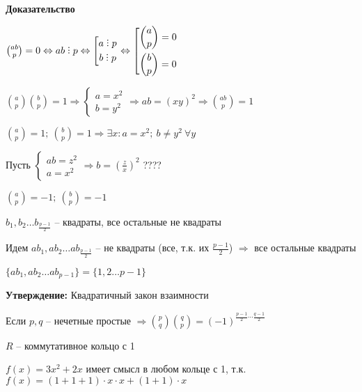 \documentclass[14pt, letter paper]{article}
\def\divby{%
  \mathrel{\text{\vbox{\baselineskip.65ex\lineskiplimit0pt\hbox{.}\hbox{.}\hbox{.}}}}%
}
\begin{document}
\begin{enumerate}
    \begin{center}
        \textbf{Доказательство}
    \end{center}

    ${ab \choose p} = 0 \Leftrightarrow ab \divby p \Leftrightarrow \left[ \begin{gathered}
        a \divby p \\
        b \divby p
    \end{gathered} \right. \Leftrightarrow \left[ \begin{gathered}
        {a \choose p} = 0 \\
        {b \choose p} = 0
    \end{gathered} \right.$

    ${a \choose p}{b \choose p} = 1 \Rightarrow \begin{cases}
        a = x^2 \\
        b = y^2
    \end{cases} \Rightarrow ab = (xy)^2 \Rightarrow {ab \choose p} = 1$

    ${a \choose p} = 1;\ {b \choose p} = 1 \Rightarrow \exists x : a = x^2;\ b \neq y^2\ \forall y$

    Пусть $\begin{cases}
        ab = z^2 \\
        a = x^2
    \end{cases} \Rightarrow b = (\frac{z}{x})^2$ ????

    ${a \choose p} = -1;\ {b \choose p} = -1$

    $b_1, b_2 \ldots b_\frac{p-1}{2}$ -- квадраты, все остальные не квадраты

    Идем $ab_1, ab_2 \ldots ab_\frac{p-1}{2}$ -- не квадраты (все, т.к. их $\frac{p-1}{2}$) $\Rightarrow$ все остальные квадраты

    $\{ab_1, ab_2 \ldots ab_{p-1}\} = \{1, 2 \ldots p-1\}$

    \textbf{Утверждение:} Квадратичный закон взаимности

    Если $p, q$ -- нечетные простые $\Rightarrow {p \choose q}{q \choose p} = (-1)^{\frac{p-1}{2} \cdots \frac{q-1}{2}}$
\end{enumerate}

\vspace{5mm}

$R$ -- коммутативное кольцо с 1

$f(x) = 3x^2 + 2x$ имеет смысл в любом кольце с 1, т.к. $f(x) = (1 + 1 + 1) \cdot x \cdot x + (1 + 1) \cdot x$
\end{document}
